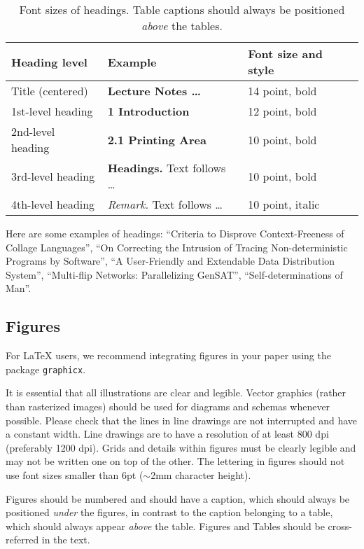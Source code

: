 \documentclass[runningheads]{eccv/llncs}
\begin{document}
\begin{table}[tb]
  \caption{Font sizes of headings. 
    Table captions should always be positioned \emph{above} the tables.
  }
  \label{tab:headings}
  \centering
  \begin{tabular}{@{}lll@{}}
    \toprule
    Heading level & Example & Font size and style\\
    \midrule
    Title (centered)  & {\Large\bf Lecture Notes \dots} & 14 point, bold\\
    1st-level heading & {\large\bf 1 Introduction} & 12 point, bold\\
    2nd-level heading & {\bf 2.1 Printing Area} & 10 point, bold\\
    3rd-level heading & {\bf Headings.} Text follows \dots & 10 point, bold\\
    4th-level heading & {\it Remark.} Text follows \dots & 10 point, italic\\
  \bottomrule
  \end{tabular}
\end{table}

Here are some examples of headings: 
``Criteria to Disprove Context-Freeness of Collage Languages'', ``On Correcting the Intrusion of Tracing Non-deterministic Programs by Software'', ``A User-Friendly and Extendable Data Distribution System'', ``Multi-flip Networks: Parallelizing GenSAT'', ``Self-determinations of Man''.


\subsection{Figures}
\label{sect:figures}
For \LaTeX{} users, we recommend integrating figures in your paper using the package \texttt{graphicx}.

It is essential that all illustrations are clear and legible. 
Vector graphics (rather than rasterized images) should be used for diagrams and schemas whenever possible. 
Please check that the lines in line drawings are not interrupted and have a constant width. 
Line drawings are to have a resolution of at least 800 dpi (preferably 1200 dpi).
Grids and details within figures must be clearly legible and may not be written one on top of the other. 
The lettering in figures should not use font sizes smaller than 6\:pt ($\sim$2\:mm character height). 

Figures should be numbered and should have a caption, which should always be positioned \emph{under} the figures, in contrast to the caption belonging to a table, which should always appear \emph{above} the table.
Figures and Tables should be cross-referred in the text.
\end{document}
